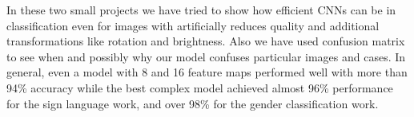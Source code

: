 In these two small projects we have tried to show how efficient CNNs can be in classification even for images with artificially reduces quality and additional
transformations like rotation and brightness.
Also we have used confusion matrix \cite{scikit-learn} to see when and possibly why our model confuses particular images and cases.
In general, even a model with 8 and 16 feature maps performed well with more than 94\% accuracy while the best complex model
achieved almost 96\% performance for the sign language work, and over 98\% for the gender classification work.
